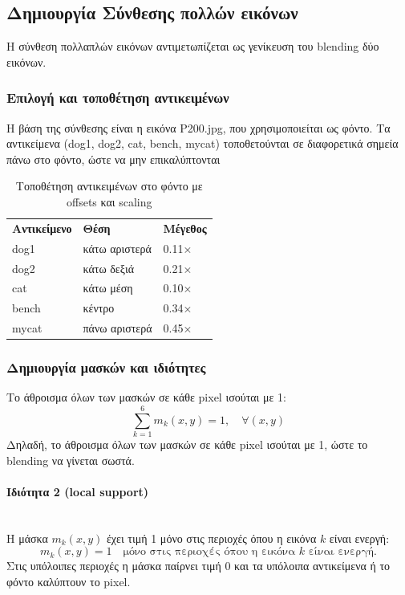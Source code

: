 \documentclass[12pt]{article}
\begin{document}
\subsection{Δημιουργία Σύνθεσης πολλών εικόνων}
Η σύνθεση πολλαπλών εικόνων αντιμετωπίζεται ως γενίκευση του blending δύο εικόνων.
\subsubsection{Επιλογή και τοποθέτηση αντικειμένων}
Η βάση της σύνθεσης είναι η εικόνα P200.jpg, που χρησιμοποιείται ως φόντο.
Τα αντικείμενα (dog1, dog2, cat, bench, mycat) τοποθετούνται σε διαφορετικά σημεία πάνω στο φόντο, ώστε να μην επικαλύπτονται

\begin{table}[h!]
    \centering
    \begin{tabular}{l l l}
    \textbf{Αντικείμενο} & \textbf{Θέση} & \textbf{Μέγεθος} \\
    dog1 & κάτω αριστερά & 0.11× \\
    dog2 & κάτω δεξιά & 0.21× \\
    cat & κάτω μέση & 0.10× \\
    bench & κέντρο & 0.34× \\
    mycat & πάνω αριστερά & 0.45× \\
    \end{tabular}
    \caption{Τοποθέτηση αντικειμένων στο φόντο με offsets και scaling}
    \label{tab:objects}
    \end{table}

\subsubsection{Δημιουργία μασκών και ιδιότητες}
Το άθροισμα όλων των μασκών σε κάθε pixel ισούται με 1:
\[
\sum_{k=1}^{6} m_k(x,y) = 1, \quad \forall (x,y)
\]
Δηλαδή, το άθροισμα όλων των μασκών σε κάθε pixel ισούται με 1, ώστε το blending να γίνεται σωστά.

\paragraph{Ιδιότητα 2 (local support)}
\mbox{}\\
Η μάσκα $m_k(x,y)$ έχει τιμή 1 μόνο στις περιοχές όπου η εικόνα $k$ είναι ενεργή:
\[
m_k(x,y) = 1 \quad \text{μόνο στις περιοχές όπου η εικόνα $k$ είναι ενεργή.}
\]
Στις υπόλοιπες περιοχές η μάσκα παίρνει τιμή 0 και τα υπόλοιπα αντικείμενα ή το φόντο καλύπτουν το pixel.
\end{document}
